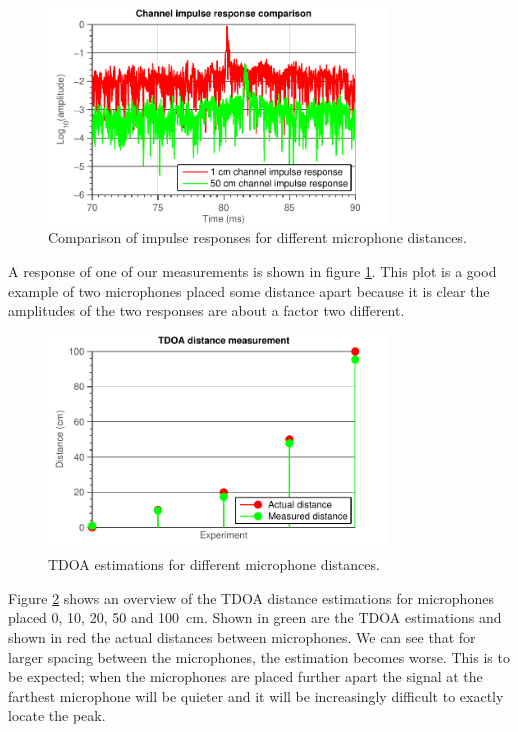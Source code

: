 \documentclass[11pt,titlepage]{report}
\begin{document}
\begin{figure}[H]
	\centering
	\includegraphics[width=0.8\textwidth]{../../deliverable-7-resources/figures/ass-2/report-2-3/ass-2-report-2-impulse-responses-4.pdf}
	\caption{Comparison of impulse responses for different microphone distances.}
	\label{fig:ass-2-rep-2-impulse-1-20}
\end{figure}

A response of one of our measurements is shown in figure \ref{fig:ass-2-rep-2-impulse-1-20}. This plot is a good example of two microphones placed some distance apart because it is clear the amplitudes of the two responses are about a factor two different. 

\begin{figure}[H]
	\centering
	\includegraphics[width=0.8\textwidth]{../../deliverable-7-resources/figures/ass-2/report-2-3/ass-2-report-2-results.pdf}
	\caption{TDOA estimations for different microphone distances.}
	\label{fig:ass-2-rep-2-result}
\end{figure}

Figure \ref{fig:ass-2-rep-2-result} shows an overview of the TDOA distance estimations for microphones placed \num{0}, \num{10}, \num{20}, \num{50} and \SI{100}{\centi\meter}. Shown in green are the TDOA estimations and shown in red the actual distances between microphones. We can see that for larger spacing between the microphones, the estimation becomes worse. This is to be expected; when the microphones are placed further apart the signal at the farthest microphone will be quieter and it will be increasingly difficult to exactly locate the peak. 
\end{document}
